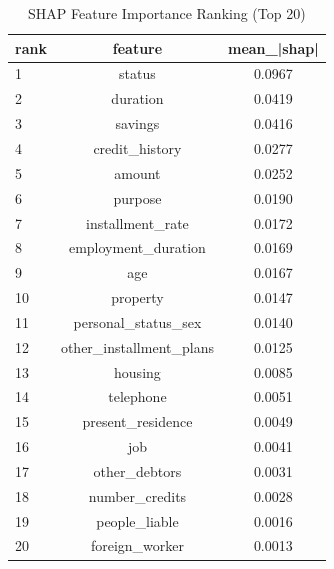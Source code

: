 \begin{table}
\centering
\caption{SHAP Feature Importance Ranking (Top 20)}
\label{tab:shap_ranking}
\begin{tabular}{lcc}
\toprule
rank & feature & mean_|shap| \\
\midrule
1 & status & 0.0967 \\
2 & duration & 0.0419 \\
3 & savings & 0.0416 \\
4 & credit_history & 0.0277 \\
5 & amount & 0.0252 \\
6 & purpose & 0.0190 \\
7 & installment_rate & 0.0172 \\
8 & employment_duration & 0.0169 \\
9 & age & 0.0167 \\
10 & property & 0.0147 \\
11 & personal_status_sex & 0.0140 \\
12 & other_installment_plans & 0.0125 \\
13 & housing & 0.0085 \\
14 & telephone & 0.0051 \\
15 & present_residence & 0.0049 \\
16 & job & 0.0041 \\
17 & other_debtors & 0.0031 \\
18 & number_credits & 0.0028 \\
19 & people_liable & 0.0016 \\
20 & foreign_worker & 0.0013 \\
\bottomrule
\end{tabular}
\end{table}
